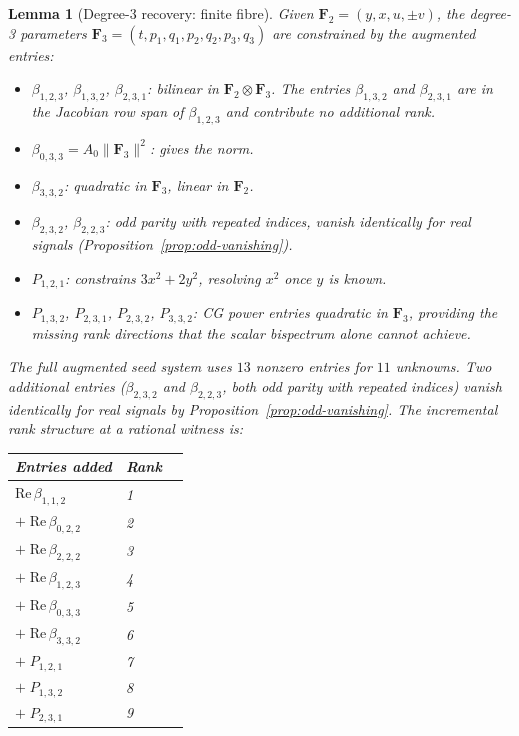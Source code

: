 \documentclass[11pt]{article}
\newtheorem{lemma}[theorem]{Lemma}
\newcommand{\norm}[1]{\lVert #1 \rVert}
\begin{document}
\begin{lemma}[Degree-3 recovery: finite fibre]\label{lem:ell3}
Given $\mathbf{F}_2 = (y,x,u,\pm v)$, the degree-3 parameters
$\mathbf{F}_3 = (t, p_1, q_1, p_2, q_2, p_3, q_3)$ are constrained by the
augmented entries:
\begin{itemize}[nosep]
\item $\beta_{1,2,3}$, $\beta_{1,3,2}$, $\beta_{2,3,1}$: bilinear in
  $\mathbf{F}_2 \otimes \mathbf{F}_3$.
  The entries $\beta_{1,3,2}$ and $\beta_{2,3,1}$ are in the Jacobian
  row span of $\beta_{1,2,3}$ and contribute no additional rank.
\item $\beta_{0,3,3} = A_0\norm{\mathbf{F}_3}^2$: gives the norm.
\item $\beta_{3,3,2}$: quadratic in $\mathbf{F}_3$, linear in $\mathbf{F}_2$.
\item $\beta_{2,3,2}$, $\beta_{2,2,3}$: odd parity with repeated indices,
  vanish identically for real signals (Proposition~\ref{prop:odd-vanishing}).
\item $P_{1,2,1}$: constrains $3x^2+2y^2$, resolving $x^2$ once $y$ is known.
\item $P_{1,3,2}$, $P_{2,3,1}$, $P_{2,3,2}$, $P_{3,3,2}$: CG power entries
  quadratic in $\mathbf{F}_3$, providing the missing rank directions that the
  scalar bispectrum alone cannot achieve.
\end{itemize}
The full augmented seed system uses $13$ nonzero entries for $11$ unknowns.
Two additional entries ($\beta_{2,3,2}$ and $\beta_{2,2,3}$, both odd parity with
repeated indices) vanish identically for real signals by
Proposition~\ref{prop:odd-vanishing}.
The incremental rank structure at a rational witness is:
\begin{center}\small
\begin{tabular}{llc}
  Entries added & Rank \\
  \hline
  $\mathrm{Re}\,\beta_{1,1,2}$ & 1 \\
  $+\;\mathrm{Re}\,\beta_{0,2,2}$ & 2 \\
  $+\;\mathrm{Re}\,\beta_{2,2,2}$ & 3 \\
  $+\;\mathrm{Re}\,\beta_{1,2,3}$ & 4 \\
  $+\;\mathrm{Re}\,\beta_{0,3,3}$ & 5 \\
  $+\;\mathrm{Re}\,\beta_{3,3,2}$ & 6 \\
  $+\;P_{1,2,1}$ & 7 \\
  $+\;P_{1,3,2}$ & 8 \\
  $+\;P_{2,3,1}$ & 9 \\

\end{tabular}
\end{center}
\end{lemma}
\end{document}
